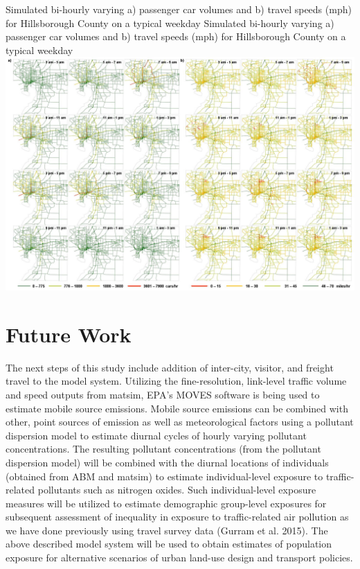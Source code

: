 \createfigure%
{Simulated bi-hourly varying a) passenger car volumes and b) travel speeds (mph) for Hillsborough County on a typical weekday}%
{Simulated bi-hourly varying a) passenger car volumes and b) travel speeds (mph) for Hillsborough County on a typical weekday}%
{\label{fig:tampa-fig3}}%
{\includegraphics[width=1.5\textwidth, angle=90]{./scenarios/figures/tampa-fig3.jpg}}%
{}

\section{Future Work}
The next steps of this study include addition of inter-city, visitor, and freight travel to the model system. Utilizing the fine-resolution, link-level traffic volume and speed outputs from \gls{matsim}, EPA’s MOVES software is being used to estimate mobile source emissions. Mobile source emissions can be combined with other, point sources of emission as well as meteorological factors using a pollutant dispersion model to estimate diurnal cycles of hourly varying pollutant concentrations. The resulting pollutant concentrations (from the pollutant dispersion model) will be combined with the diurnal locations of individuals (obtained from ABM and \gls{matsim}) to estimate individual-level exposure to traffic-related pollutants such as nitrogen oxides. Such individual-level exposure measures will be utilized to estimate demographic group-level exposures for subsequent assessment of inequality in exposure to traffic-related air pollution as we have done previously using travel survey data \citep[][]{}(Gurram et al. 2015). The above described model system will be used to obtain estimates of population exposure for alternative scenarios of urban land-use design and transport policies.

